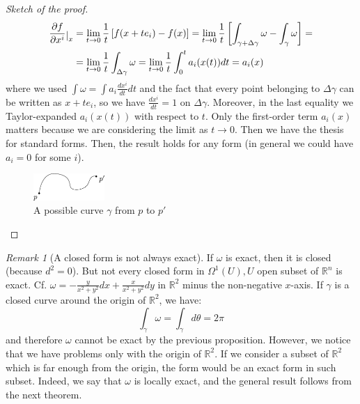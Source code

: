 \documentclass[a4paper,11pt,titlepage, article, oneside]{memoir}
\numberwithin{equation}{section}
\theoremstyle{definition}
\theoremstyle{remark}
\newtheorem{remark}[theorem]{Remark}
\newcommand{\rfield}{\mathbb{R}}
\newcommand{\restrict}[2]{{#1}\raisebox{-.5ex}{$|$}_{#2}}
\begin{document}
\begin{proof}[Sketch of the proof]
\begin{align*}
\restrict{\frac{\partial f}{\partial x^i}}{x} &= \lim\limits_{t \to 0} \frac{1}{t} \left[ f(x+t e_i) - f(x) \right] = \lim\limits_{t \to 0} \frac{1}{t} \left[  \int_{\gamma + \Delta \gamma} \omega - \int_{\gamma} \omega \right] = \\
&= \lim\limits_{t \to 0} \frac{1}{t} \int_{\Delta \gamma} \omega = \lim\limits_{t \to 0} \frac{1}{t} \int_0^t a_i(x(t)) dt = a_i(x)
\end{align*}
where we used $\int \omega = \int a_i \frac{dx^i}{dt} dt$ and the fact that every point belonging to $\Delta \gamma$ can be written as $x + t e_i$, so we have $\frac{dx^i}{dt} = 1$ on $\Delta \gamma$. Moreover, in the last equality we Taylor-expanded $a_i(x(t))$ with respect to $t$. Only the first-order term $a_i(x)$ matters because we are considering the limit as $t \to 0$. Then we have the thesis for standard forms. Then, the result holds for any form (in general we could have $a_i = 0$ for some $i$).
\begin{figure}[h] \label{Fig:pcurve}
     \centering
     \includegraphics[width=0.24\textwidth]{Images/pp'.pdf} 
     \caption{A possible curve $\gamma$ from $p$ to $p'$}      
\end{figure}
\end{proof}

\begin{remarkbox}\begin{remark}[A closed form is not always exact]
  If $\omega$ is exact, then it is closed (because $d^2=0$). But not every closed form in $\Omega^1(U), U$ open subset of $\rfield^n$ is exact. Cf. $\omega = - \frac{y}{x^2 + y^2} dx + \frac{x}{x^2+y^2}dy$ in $\rfield^2$ minus the non-negative $x$-axis. If $\gamma$ is a closed curve around the origin of $\rfield^2$, we have:
  $$\int_{\gamma} \omega = \int_{\gamma} d\theta = 2\pi$$
  and therefore $\omega$ cannot be exact by the previous proposition. However, we notice that we have problems only with the origin of $\rfield^2$. If we consider a subset of $\rfield^2$ which is far enough from the origin, the form would be an exact form in such subset. Indeed, we say that $\omega$ is locally exact, and the general result follows from the next theorem.
\end{remark}\end{remarkbox}
\end{document}
